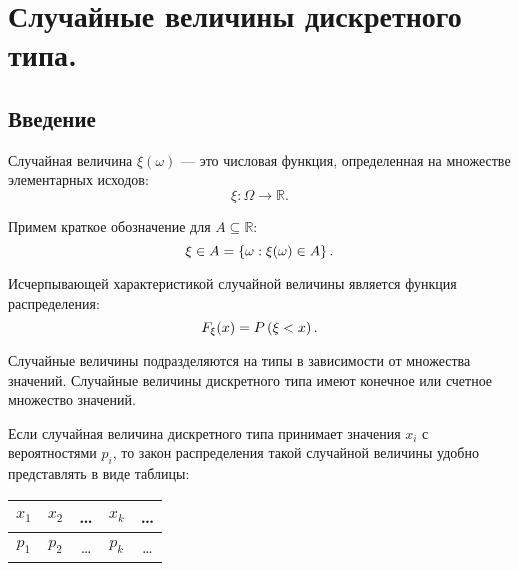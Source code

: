 \chapter{Случайные величины дискретного типа.}

\section*{Введение}

Случайная величина $\xi(\omega)$ --- это числовая функция, определенная на множестве элементарных исходов:
\begin{equation}
    \xi : \Omega \rightarrow \mathbb{R}.
\end{equation}

Примем краткое обозначение для $A \subseteq \mathbb{R}$:
\begin{equation}
    \xi \in A = \left \{ \omega : \xi(\omega) \in A \right \}.
\end{equation}

Исчерпывающей характеристикой случайной величины является функция распределения:
\begin{equation}
    F_\xi(x) = P \left ( \xi < x \right ).
\end{equation}

Случайные величины подразделяются на типы в зависимости от множества значений. Случайные величины дискретного типа имеют конечное или счетное множество значений.

Если случайная величина дискретного типа принимает значения $x_i$ с вероятностями $p_i$, то закон распределения такой случайной величины удобно представлять в виде таблицы:
\begin{center}
    \begin{tabular}{|c|c|c|c|c|}
        \hline
        $x_1$ & $x_2$ & \dots & $x_k$ & \dots \\
        \hline
        $p_1$ & $p_2$ & \dots & $p_k$ & \dots \\
        \hline
    \end{tabular}
\end{center}

